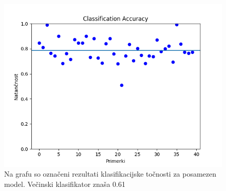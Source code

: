 \documentclass[a4paper,11pt]{article}
\begin{document}
\begin{figure}[!htb]
	\begin{center}
		\includegraphics[scale=0.8]{slike/klasifikacija_1.png}
		\caption{Na grafu so označeni rezultati klasifikacijske točnosti za posamezen model. Večinski klasifikator znaša 0.61}
		\label{slika 4}
	\end{center}
\end{figure}
\end{document}
